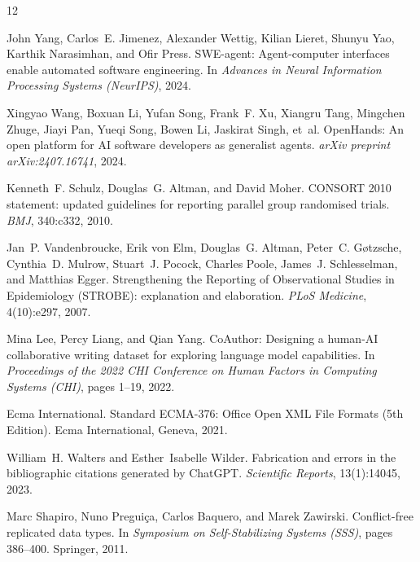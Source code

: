 \documentclass[11pt,a4paper]{article}
\begin{document}
\begin{thebibliography}{12}
\setlength{\itemsep}{2pt}

John Yang, Carlos~E. Jimenez, Alexander Wettig, Kilian Lieret, Shunyu Yao, Karthik Narasimhan, and Ofir Press.
\newblock SWE-agent: Agent-computer interfaces enable automated software engineering.
\newblock In \emph{Advances in Neural Information Processing Systems (NeurIPS)}, 2024.

Xingyao Wang, Boxuan Li, Yufan Song, Frank~F. Xu, Xiangru Tang, Mingchen Zhuge, Jiayi Pan, Yueqi Song, Bowen Li, Jaskirat Singh, et~al.
\newblock OpenHands: An open platform for AI software developers as generalist agents.
\newblock \emph{arXiv preprint arXiv:2407.16741}, 2024.

Kenneth~F. Schulz, Douglas~G. Altman, and David Moher.
\newblock CONSORT 2010 statement: updated guidelines for reporting parallel group randomised trials.
\newblock \emph{BMJ}, 340:c332, 2010.

Jan~P. Vandenbroucke, Erik von Elm, Douglas~G. Altman, Peter~C. G{\o}tzsche, Cynthia~D. Mulrow, Stuart~J. Pocock, Charles Poole, James~J. Schlesselman, and Matthias Egger.
\newblock Strengthening the Reporting of Observational Studies in Epidemiology (STROBE): explanation and elaboration.
\newblock \emph{PLoS Medicine}, 4(10):e297, 2007.

Mina Lee, Percy Liang, and Qian Yang.
\newblock CoAuthor: Designing a human-AI collaborative writing dataset for exploring language model capabilities.
\newblock In \emph{Proceedings of the 2022 CHI Conference on Human Factors in Computing Systems (CHI)}, pages 1--19, 2022.

Ecma International.
\newblock Standard ECMA-376: Office Open XML File Formats (5th Edition).
\newblock Ecma International, Geneva, 2021.

William~H. Walters and Esther~Isabelle Wilder.
\newblock Fabrication and errors in the bibliographic citations generated by ChatGPT.
\newblock \emph{Scientific Reports}, 13(1):14045, 2023.

Marc Shapiro, Nuno Pregui{\c{c}}a, Carlos Baquero, and Marek Zawirski.
\newblock Conflict-free replicated data types.
\newblock In \emph{Symposium on Self-Stabilizing Systems (SSS)}, pages 386--400. Springer, 2011.


\end{thebibliography}
\end{document}
